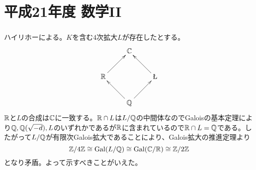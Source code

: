 \section{平成21年度 数学II}

\subsubsection{}%
\begin{sol}
ハイリホーによる。$K$を含む$4$次拡大$L$が存在したとする。
\[
\xymatrix{
{} & \C & {} \\
\R \ar[ru] & {} & \L \ar[lu] \\
{} & \Q \ar[lu] \ar[ru] & {}
}
\]
${\mathbb R}$と$L$の合成は${\mathbb C}$に一致する。${\mathbb R} \cap L$は$L / {\mathbb Q}$の中間体なのでGaloisの基本定理により${\mathbb Q}, {\mathbb Q}(\sqrt{-d}), L$のいずれかであるが${\mathbb R}$に含まれているので${\mathbb R} \cap L = {\mathbb Q}$である。したがって$L/{\mathbb Q}$が有限次Galois拡大であることにより、Galois拡大の推進定理より
\[
\mathbb{Z} / 4 \mathbb{Z} \cong \operatorname{Gal}(L/{\mathbb Q}) \cong \operatorname{Gal}({\mathbb C}/{\mathbb R}) \cong \mathbb{Z} / 2 \mathbb{Z}
\]
となり矛盾。よって示すべきことがいえた。
\end{sol}


\newpage


